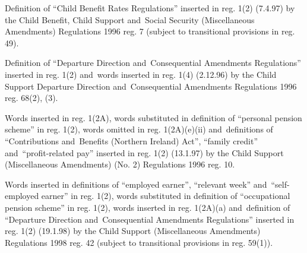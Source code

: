 \documentclass[12pt,a4paper]{article}
\begin{document}
{Definition of ``Child Benefit Rates Regulations'' inserted in reg. 1(2) (7.4.97) by the Child Benefit, Child Support and~Social Security (Miscellaneous Amendments) Regulations 1996 reg. 7 (subject to transitional provisions in reg. 49).

Definition of ``Departure Direction and~Consequential Amendments Regulations'' inserted in reg. 1(2) and~words inserted in reg. 1(4) (2.12.96) by the Child Support Departure Direction and~Consequential Amendments Regulations 1996 reg. 68(2), (3).

Words inserted in reg. 1(2A), words substituted in definition of ``personal pension scheme'' in reg. 1(2), words omitted in reg. 1(2A)(e)(ii) and~definitions of ``Contributions and~Benefits (Northern Ireland) Act'', ``family credit'' and~``profit-related pay'' inserted in reg. 1(2) (13.1.97) by the Child Support (Miscellaneous Amendments) (No. 2) Regulations 1996 reg. 10.

Words inserted in definitions of ``employed earner'', ``relevant week'' and~``self-employed earner'' in reg. 1(2), words substituted in definition of ``occupational pension scheme'' in reg. 1(2), words inserted in reg. 1(2A)(a) and~definition of ``Departure Direction and~Consequential Amendments Regulations'' inserted in reg. 1(2) (19.1.98) by the Child Support (Miscellaneous Amendments) Regulations 1998 reg. 42 (subject to transitional provisions in reg. 59(1)).


}
\end{document}
